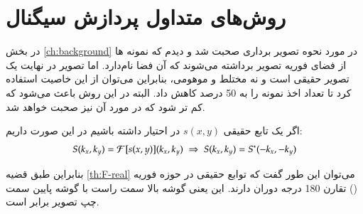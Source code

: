 \section{روش‌های متداول پردازش سیگنال}
در بخش \ref{ch:background} در مورد نحوه تصویر برداری \mri صحبت شد و دیدم که نمونه ها از فضای فوریه تصویر برداشته می‌شوند که آن فضا \kspace نام‌دارد. اما تصویر در نهایت یک تصویر حقیقی است و نه مختلط و موهومی، بنابراین می‌توان از این خاصیت استفاده کرد تا تعداد اخذ نمونه را به 50 درصد کاهش داد. البته در این روش باعث می‌شود که  کم تر شود که در مورد آن نیز صحبت خواهد شد.

\begin{قضیه}\label{th:F-real}
اگر یک تابع حقیقی $s(x,y)$ در احتیار داشته باشیم در این صورت داریم:
$$S(k_x, k_y) = \mathcal{F}[s(x,y)](k_x, k_y) \; \Rightarrow \; S(k_x, k_y) = S^*(-k_x,-k_y) $$
\end{قضیه}

بنابراین طبق قضیه \ref{th:F-real}
می‌توان این طور گفت که توابع حقیقی در حوزه فوریه (\kspace)
تقارن 180 درجه دوران دارند. این یعنی گوشه بالا سمت راست \kspace با گوشه پایین سمت چپ تصویر برابر است.





\begin{figure}[t!]
	\centering
	\begin{copyrightBox}{0.7\linewidth}{}
	\centering
	\hspace{0.15\linewidth}
	\end{copyrightBox}
	\removevspace[1]
	\caption{}
	\label{fig:half-fourier}
\end{figure}



